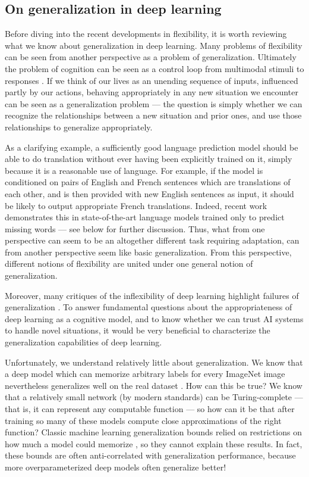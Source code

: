 \subsection{On generalization in deep learning}
Before diving into the recent developments in flexibility, it is worth reviewing what we know about generalization in deep learning. Many problems of flexibility can be seen from another perspective as a problem of generalization. Ultimately the problem of cognition can be seen as a control loop from multimodal stimuli to responses \citep{Cisek1999,Cisek2019}. If we think of our lives as an unending sequence of inputs, influenced partly by our actions, behaving appropriately in any new situation we encounter can be seen as a generalization problem --- the question is simply whether we can recognize the relationships between a new situation and prior ones, and use those relationships to generalize appropriately.\par
As a clarifying example, a sufficiently good language prediction model should be able to do translation without ever having been explicitly trained on it, simply because it is a reasonable use of language. For example, if the model is conditioned on pairs of English and French sentences which are translations of each other, and is then provided with new English sentences as input, it should be likely to output appropriate French translations. Indeed, recent work demonstrates this in state-of-the-art language models trained only to predict missing words \citep{Radford2019} --- see below for further discussion. Thus, what from one perspective can seem to be an altogether different task requiring adaptation, can from another perspective seem like basic generalization. From this perspective, different notions of flexibility are united under one general notion of generalization. \par
Moreover, many critiques of the inflexibility of deep learning highlight failures of generalization \citep[e.g.][]{Marcus2018}. To answer fundamental questions about the appropriateness of deep learning as a cognitive model, and to know whether we can trust AI systems to handle novel situations, it would be very beneficial to characterize the generalization capabilities of deep learning. \par 
Unfortunately, we understand relatively little about generalization. We know that a deep model which can memorize arbitrary labels for every ImageNet image nevertheless generalizes well on the real dataset \citep{Zhang2016}. How can this be true? We know that a relatively small network (by modern standards) can be Turing-complete \citep{Siegelman1992} --- that is, it can represent any computable function --- so how can it be that after training so many of these models compute close approximations of the right function? Classic machine learning generalization bounds relied on restrictions on how much a model could memorize \citep[e.g.][]{Vapnik1971}, so they cannot explain these results. In fact, these bounds are often anti-correlated with generalization performance, because more overparameterized deep models often generalize better! \par
